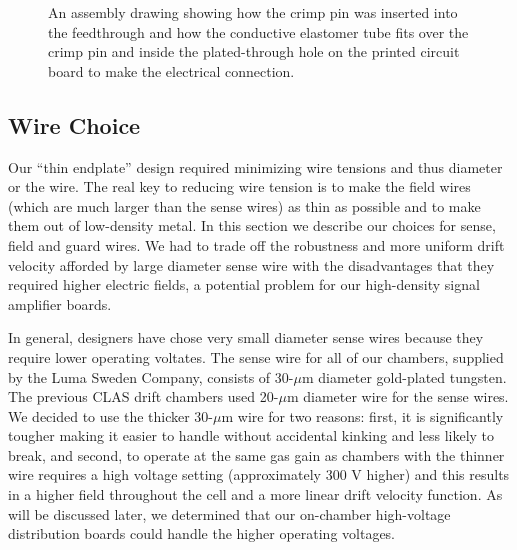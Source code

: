 \begin{figure}[htbp]
\vspace{8.0cm}
\caption{\small{An assembly drawing showing how the crimp pin was inserted
into the feedthrough and how the conductive elastomer tube fits over the 
crimp pin and inside the plated-through hole on the printed circuit board to 
make the electrical connection.}}
\label{crimp}
\end{figure}

\subsection{Wire Choice}
\hskip 0.15in

Our ``thin endplate'' design required minimizing wire tensions and
thus diameter or the wire.  The real key to reducing wire tension is to
make the field wires (which are much larger than the sense wires) as 
thin as possible and to make them out of low-density metal.  In this 
section we describe our choices for sense, field and guard wires.
We had to trade off the robustness and more uniform drift velocity
afforded by large diameter sense wire with the disadvantages that they
required higher electric fields, a potential problem for our high-density
signal amplifier boards.

In general, designers have chose very small diameter sense wires because they
require lower operating voltates.
The sense wire for all of our chambers, supplied by the Luma
Sweden Company, consists of 30-$\mu$m diameter gold-plated tungsten.  
The previous CLAS drift chambers used 20-$\mu$m diameter wire for the
sense wires.  We decided to use the thicker 30-$\mu$m wire for two 
reasons: first, it is significantly tougher making it easier to handle without
accidental kinking and less likely to break, and second, to operate at the same 
gas gain as chambers with the thinner wire requires a high voltage setting 
(approximately 300 V higher) and this results in a higher field throughout the cell
and a more linear drift velocity function.  As will be discussed later,
we determined that our on-chamber high-voltage distribution boards could
handle the higher operating voltages.

